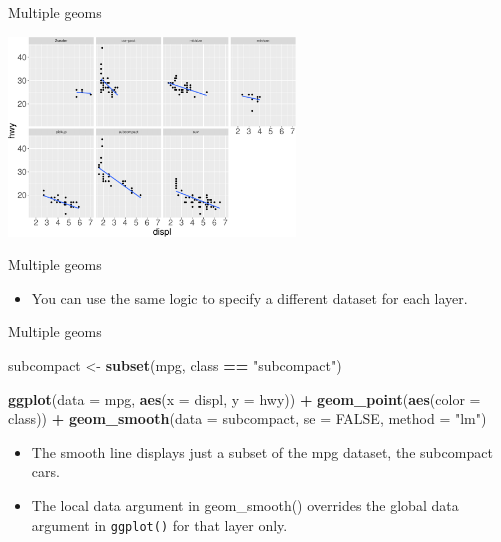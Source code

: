 \documentclass[ignorenonframetext,]{beamer}
\newenvironment{Shaded}{\begin{snugshade}}{\end{snugshade}}
\newcommand{\DataTypeTok}[1]{\textcolor[rgb]{0.13,0.29,0.53}{#1}}
\newcommand{\KeywordTok}[1]{\textcolor[rgb]{0.13,0.29,0.53}{\textbf{#1}}}
\newcommand{\NormalTok}[1]{#1}
\newcommand{\OperatorTok}[1]{\textcolor[rgb]{0.81,0.36,0.00}{\textbf{#1}}}
\newcommand{\OtherTok}[1]{\textcolor[rgb]{0.56,0.35,0.01}{#1}}
\newcommand{\StringTok}[1]{\textcolor[rgb]{0.31,0.60,0.02}{#1}}
\providecommand{\tightlist}{%
  \setlength{\itemsep}{0pt}\setlength{\parskip}{0pt}}
\begin{document}
\begin{frame}{Multiple geoms}
\protect\hypertarget{multiple-geoms-25}{}

\begin{center}\includegraphics[height=200px]{data-visualization_files/figure-beamer/unnamed-chunk-103-1} \end{center}

\end{frame}

\begin{frame}{Multiple geoms}
\protect\hypertarget{multiple-geoms-26}{}

\begin{itemize}
\tightlist
\item
  You can use the same logic to specify a different dataset for each
  layer.
\end{itemize}

\end{frame}

\begin{frame}[fragile]{Multiple geoms}
\protect\hypertarget{multiple-geoms-27}{}

\begin{Shaded}
\begin{Highlighting}[]
\NormalTok{subcompact <-}\StringTok{ }\KeywordTok{subset}\NormalTok{(mpg, class }\OperatorTok{==}\StringTok{ "subcompact"}\NormalTok{)}

\KeywordTok{ggplot}\NormalTok{(}\DataTypeTok{data =}\NormalTok{ mpg, }\KeywordTok{aes}\NormalTok{(}\DataTypeTok{x =}\NormalTok{ displ, }\DataTypeTok{y =}\NormalTok{ hwy)) }\OperatorTok{+}
\StringTok{  }\KeywordTok{geom_point}\NormalTok{(}\KeywordTok{aes}\NormalTok{(}\DataTypeTok{color =}\NormalTok{ class)) }\OperatorTok{+}
\StringTok{  }\KeywordTok{geom_smooth}\NormalTok{(}\DataTypeTok{data =}\NormalTok{ subcompact, }\DataTypeTok{se =} \OtherTok{FALSE}\NormalTok{, }
              \DataTypeTok{method =} \StringTok{"lm"}\NormalTok{)}
\end{Highlighting}
\end{Shaded}

\begin{itemize}
\item
  The smooth line displays just a subset of the mpg dataset, the
  subcompact cars.
\item
  The local data argument in geom\_smooth() overrides the global data
  argument in \texttt{ggplot()} for that layer only.
\end{itemize}

\end{frame}
\end{document}
